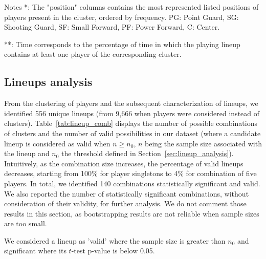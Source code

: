\begin{table}
  \footnotesize
  \caption{Clusters presentation}
  \label{tab:clust}
  
  {\raggedright \small Notes *: The "position" columns contains the most represented listed positions of players present in the cluster, ordered by frequency. 
  PG: Point Guard, SG: Shooting Guard, SF: Small Forward, PF: Power Forward, C: Center.

  **: Time corresponds to the percentage of time in which the playing lineup contains at least one player of the corresponding cluster.}

\end{table}

\subsection{Lineups analysis}

From the clustering of players and the subsequent characterization of lineups, we identified 556 unique lineups (from 9,666 when players were considered instead of clusters).
Table~\ref{tab:lineup_comb} displays the number of possible combinations of clusters and the number of valid possibilities in our dataset (where a candidate lineup is considered as valid when $n \geq n_0$, $n$ being the sample size associated with the lineup and $n_0$ the threshold defined in Section~\ref{sec:lineup_analysis}).
Intuitively, as the combination size increases, the percentage of valid lineups decreases, starting from 100\% for player singletons to 4\% for combination of five players.
In total, we identified 140 combinations statistically significant and valid. 
We also reported the number of statistically significant combinations, without consideration of their validity, for further analysis.  
We do not comment those results in this section, as bootstrapping results are not reliable when sample sizes are too small.

\begin{table}
  \small
  \centering
  \caption{Lineup combinations}
  \label{tab:lineup_comb}
  
  
  {\raggedright \small We considered a lineup as 'valid' where the sample size is greater than $n_0$ and significant where its $t$-test p-value is below 0.05.}
\end{table}


